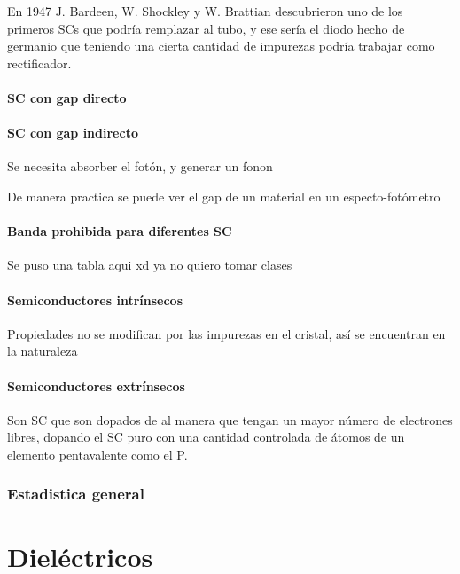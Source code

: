 \documentclass[11pt]{report}
\theoremstyle{plain}
\theoremstyle{definition}
\begin{document}
En 1947 J. Bardeen, W. Shockley y W. Brattian descubrieron uno de los primeros SCs que podría remplazar al tubo, y ese sería el diodo hecho de germanio que teniendo una cierta cantidad de impurezas podría trabajar como rectificador.



\subsubsection{SC con gap directo}

\subsubsection{SC con gap indirecto}
Se necesita absorber el fotón, y generar un fonon

De manera practica se puede ver el gap de un material en un especto-fotómetro

\subsubsection{Banda prohibida para diferentes SC}
Se puso una tabla aqui xd ya no quiero tomar clases 

\subsubsection{Semiconductores intrínsecos}

Propiedades no se modifican por las impurezas en el cristal, así se encuentran en la naturaleza
\subsubsection{Semiconductores extrínsecos}

Son SC que son dopados de al manera que tengan un mayor número de electrones libres, dopando el SC puro con una cantidad controlada de átomos de un elemento pentavalente como el P.

\subsection{Estadistica general}
\chapter{Dieléctricos}
\end{document}
